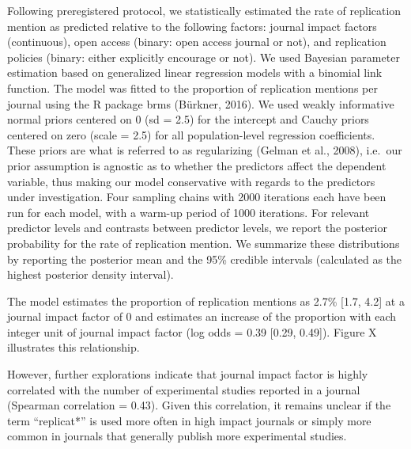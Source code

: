 \documentclass[]{elsarticle} %
\begin{document}
Following preregistered protocol, we statistically estimated the rate of
replication mention as predicted relative to the following factors:
journal impact factors (continuous), open access (binary: open access
journal or not), and replication policies (binary: either explicitly
encourage or not). We used Bayesian parameter estimation based on
generalized linear regression models with a binomial link function. The
model was fitted to the proportion of replication mentions per journal
using the R package brms (Bürkner, 2016). We used weakly informative
normal priors centered on 0 (sd = 2.5) for the intercept and Cauchy
priors centered on zero (scale = 2.5) for all population-level
regression coefficients. These priors are what is referred to as
regularizing (Gelman et al., 2008), i.e.~our prior assumption is
agnostic as to whether the predictors affect the dependent variable,
thus making our model conservative with regards to the predictors under
investigation. Four sampling chains with 2000 iterations each have been
run for each model, with a warm-up period of 1000 iterations. For
relevant predictor levels and contrasts between predictor levels, we
report the posterior probability for the rate of replication mention. We
summarize these distributions by reporting the posterior mean and the
95\% credible intervals (calculated as the highest posterior density
interval).

The model estimates the proportion of replication mentions as 2.7\%
{[}1.7, 4.2{]} at a journal impact factor of 0 and estimates an increase
of the proportion with each integer unit of journal impact factor (log
odds = 0.39 {[}0.29, 0.49{]}). Figure X illustrates this relationship.

However, further explorations indicate that journal impact factor is
highly correlated with the number of experimental studies reported in a
journal (Spearman correlation = 0.43). Given this correlation, it
remains unclear if the term ``replicat*'' is used more often in high
impact journals or simply more common in journals that generally publish
more experimental studies.
\end{document}
